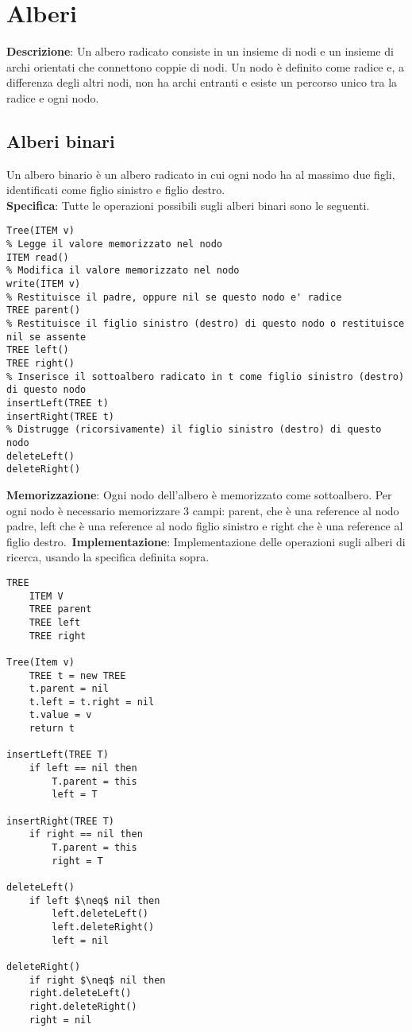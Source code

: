 \documentclass[../cheatSheetAlgoritmi.tex]{subfiles}
\begin{document}
\section{Alberi}
\textbf{Descrizione}: Un albero radicato consiste in un insieme di nodi e un insieme di archi orientati che connettono coppie di nodi. Un nodo è definito come radice e, a differenza degli altri nodi, non ha archi entranti e esiste un percorso unico tra la radice e ogni nodo.

\subsection{Alberi binari}
Un albero binario è un albero radicato in cui ogni nodo ha al massimo due figli, identificati come figlio sinistro e figlio destro.\\
\textbf{Specifica}: Tutte le operazioni possibili sugli alberi binari sono le seguenti. 
\begin{lstlisting}[caption= Specifica albero binario]
% Costruisce un nuovo nodo, contenente v, senza figli o genitori
Tree(ITEM v)
% Legge il valore memorizzato nel nodo
ITEM read()
% Modifica il valore memorizzato nel nodo
write(ITEM v)
% Restituisce il padre, oppure nil se questo nodo e' radice
TREE parent()
% Restituisce il figlio sinistro (destro) di questo nodo o restituisce nil se assente
TREE left()
TREE right()
% Inserisce il sottoalbero radicato in t come figlio sinistro (destro) di questo nodo
insertLeft(TREE t)
insertRight(TREE t)
% Distrugge (ricorsivamente) il figlio sinistro (destro) di questo nodo
deleteLeft()
deleteRight()
\end{lstlisting}
\newpage

\textbf{Memorizzazione}: Ogni nodo dell'albero è memorizzato come sottoalbero. Per ogni nodo è necessario memorizzare 3 campi: parent, che è una reference al nodo padre, left che è una reference al nodo figlio sinistro e right che è una reference al figlio destro.\
\textbf{Implementazione}: Implementazione delle operazioni sugli alberi di ricerca, usando la specifica definita sopra. 
\begin{lstlisting}[caption= Implentazione alberi binari]
TREE
	ITEM V	
	TREE parent
	TREE left
	TREE right

Tree(Item v)
	TREE t = new TREE
	t.parent = nil
	t.left = t.right = nil
	t.value = v
	return t
	
insertLeft(TREE T)
	if left == nil then
		T.parent = this
		left = T
		
insertRight(TREE T)
	if right == nil then
		T.parent = this
		right = T
		
deleteLeft()
	if left $\neq$ nil then
		left.deleteLeft()
		left.deleteRight()
		left = nil
		
deleteRight()
	if right $\neq$ nil then
	right.deleteLeft()
	right.deleteRight()
	right = nil
\end{lstlisting}
\newpage
\end{document}
